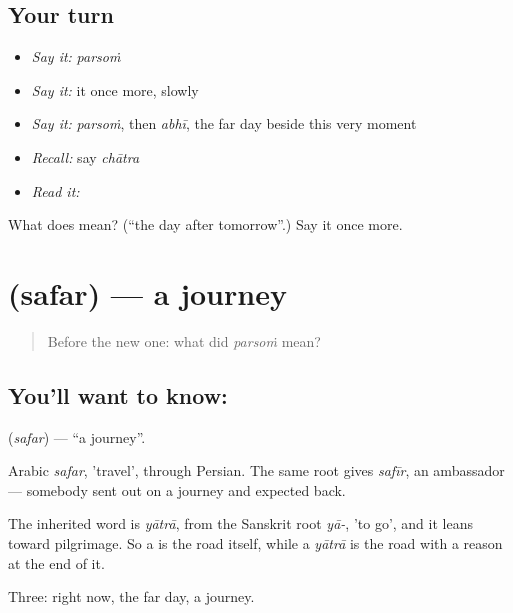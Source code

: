\subsection*{Your turn}
\begin{itemize}
\raggedright
  \item \emph{Say it:} \emph{parsoṁ}
  \item \emph{Say it:} it once more, slowly
  \item \emph{Say it:} \emph{parsoṁ}, then \emph{abhī}, the far day beside this very moment
  \item \emph{Recall:} say \emph{chātra}
  \item \emph{Read it:} \textbf{}
\end{itemize}

\begin{tcolorbox}[breakable,colback=teal!4,colframe=teal!35!black,title={Before you move on}]
What does  mean? (\textquotedblleft{}the day after tomorrow\textquotedblright{}.) Say it once more.
\end{tcolorbox}
\section[\texorpdfstring{\hi{सफ़र} (safar)}{सफ़र (safar)}]{ (safar) — a journey}

\label{lesson:HI-C49-journey}



\begin{quote}
Before the new one: what did \emph{parsoṁ} mean?
\end{quote}

\subsection*{You'll want to know: }
\textbf{} (\emph{safar}) — \textquotedblleft{}a journey\textquotedblright{}.

Arabic \emph{safar}, 'travel', through Persian. The same root gives \emph{safīr}, an ambassador — somebody sent out on a journey and expected back.

The inherited word is \emph{yātrā}, from the Sanskrit root \emph{yā-}, 'to go', and it leans toward pilgrimage. So a  is the road itself, while a \emph{yātrā} is the road with a reason at the end of it.

\begin{grammarlens}[title={What you've built}]
Three: right now, the far day, a journey.
\end{grammarlens}

